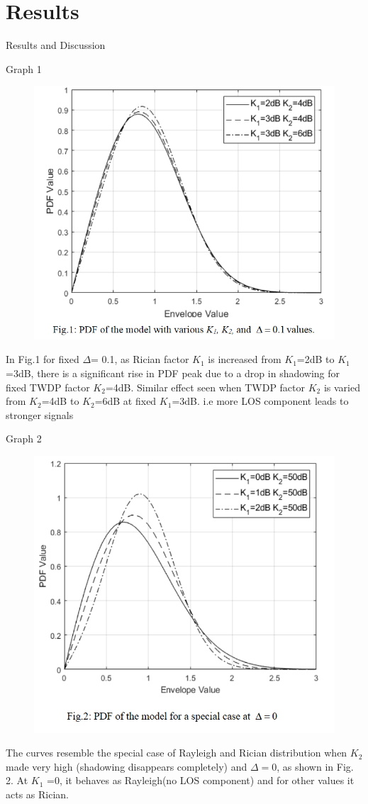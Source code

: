 \documentclass{beamer}
\begin{document}
\section{Results}
\begin{frame}{Results and Discussion}
\begin{block}{Graph 1}
 \begin{figure}
    \centering
    \includegraphics[width=0.5\columnwidth]{Figures/fig1.PNG}
    \label{fig:my_label}
\end{figure}
In Fig.1 for fixed \(\Delta\)= 0.1, as Rician factor \(K_1\) is increased from \(K_1\)=2dB to \(K_1\)=3dB, there is a significant rise in PDF peak due to  a  drop  in  shadowing  for  fixed  TWDP  factor \(K_2\)=4dB.  Similar effect seen when TWDP factor \(K_2\) is varied from \(K_2\)=4dB  to  \(K_2\)=6dB  at  fixed  \(K_1\)=3dB. i.e more LOS component leads to stronger signals
\end{block}
\end{frame}
\begin{frame}
    \begin{block}{Graph 2}
     \begin{figure}
    \centering
    \includegraphics[width=0.5\columnwidth]{Figures/fig2.PNG}
    \label{fig:my_label}
\end{figure}
The  curves  resemble  the  special  case  of  Rayleigh  and  Rician  distribution  when  \(K_2\)   made  very  high  (shadowing  disappears  completely) and \(\Delta=0\), as shown in Fig. 2. At \(K_1\) =0, it behaves as Rayleigh(no LOS component) and for other values it acts as Rician.
\end{block}
\end{frame}
\end{document}
